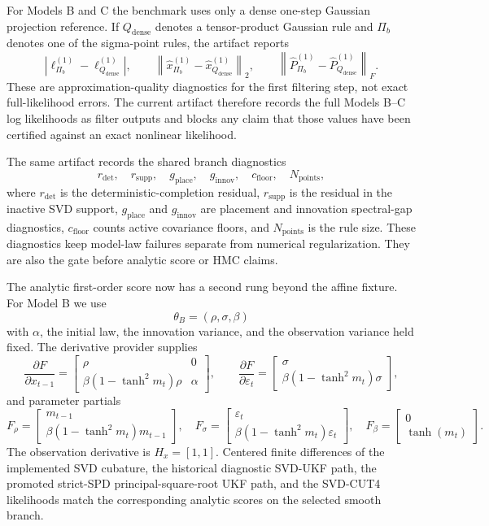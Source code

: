 For Models B and C the benchmark uses only a dense one-step Gaussian projection
reference.  If \(Q_{\mathrm{dense}}\) denotes a tensor-product Gaussian rule and
\(\Pi_b\) denotes one of the sigma-point rules, the artifact reports
\[
  \left|\ell^{(1)}_{\Pi_b}-\ell^{(1)}_{Q_{\mathrm{dense}}}\right|,\qquad
  \left\|\hat x^{(1)}_{\Pi_b}-\hat x^{(1)}_{Q_{\mathrm{dense}}}\right\|_2,
  \qquad
  \left\|\hat P^{(1)}_{\Pi_b}-\hat P^{(1)}_{Q_{\mathrm{dense}}}\right\|_F.
\]
These are approximation-quality diagnostics for the first filtering step, not
exact full-likelihood errors.  The current artifact therefore records the full
Models B--C log likelihoods as filter outputs and blocks any claim that those
values have been certified against an exact nonlinear likelihood.

The same artifact records the shared branch diagnostics
\[
  r_{\mathrm{det}},\quad r_{\mathrm{supp}},\quad
  g_{\mathrm{place}},\quad g_{\mathrm{innov}},\quad
  c_{\mathrm{floor}},\quad N_{\mathrm{points}},
\]
where \(r_{\mathrm{det}}\) is the deterministic-completion residual,
\(r_{\mathrm{supp}}\) is the residual in the inactive SVD support,
\(g_{\mathrm{place}}\) and \(g_{\mathrm{innov}}\) are placement and innovation
spectral-gap diagnostics, \(c_{\mathrm{floor}}\) counts active covariance
floors, and \(N_{\mathrm{points}}\) is the rule size.  These diagnostics keep
model-law failures separate from numerical regularization.  They are also the
gate before analytic score or HMC claims.

The analytic first-order score now has a second rung beyond the affine fixture.
For Model B we use
\[
  \theta_B=(\rho,\sigma,\beta)
\]
with \(\alpha\), the initial law, the innovation variance, and the observation
variance held fixed.  The derivative provider supplies
\[
  \frac{\partial F}{\partial x_{t-1}}
  =
  \begin{bmatrix}
    \rho & 0\\
    \beta(1-\tanh^2 m_t)\rho & \alpha
  \end{bmatrix},
  \qquad
  \frac{\partial F}{\partial \varepsilon_t}
  =
  \begin{bmatrix}
    \sigma\\
    \beta(1-\tanh^2 m_t)\sigma
  \end{bmatrix},
\]
and parameter partials
\[
  F_\rho=
  \begin{bmatrix}
    m_{t-1}\\
    \beta(1-\tanh^2 m_t)m_{t-1}
  \end{bmatrix},\quad
  F_\sigma=
  \begin{bmatrix}
    \varepsilon_t\\
    \beta(1-\tanh^2 m_t)\varepsilon_t
  \end{bmatrix},\quad
  F_\beta=
  \begin{bmatrix}
    0\\
    \tanh(m_t)
  \end{bmatrix}.
\]
The observation derivative is \(H_x=[1,1]\).  Centered finite differences of
the implemented SVD cubature, the historical diagnostic SVD-UKF path, the
promoted strict-SPD principal-square-root UKF path, and the SVD-CUT4 likelihoods
match the corresponding analytic scores on the selected smooth branch.

